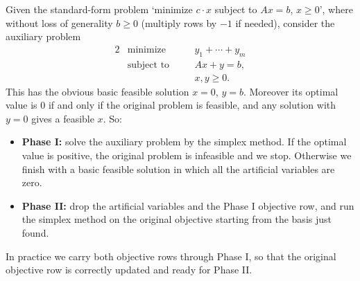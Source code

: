 Given the standard-form problem `minimize $c\cdot x$ subject to $Ax = b$, $x \geq 0$', where without loss of generality $b \geq 0$ (multiply rows by $-1$ if needed), consider the auxiliary problem
\begin{alignat*}{2}
    & \text{minimize} \quad && y_1 + \cdots + y_m \\
    & \text{subject to} \quad && Ax + y = b, \\
    & && x, y \geq 0.
\end{alignat*}
This has the obvious basic feasible solution $x = 0$, $y = b$. Moreover its optimal value is $0$ if and only if the original problem is feasible, and any solution with $y = 0$ gives a feasible $x$. So:
\begin{itemize}
    \item \textbf{Phase I:} solve the auxiliary problem by the simplex method. If the optimal value is positive, the original problem is infeasible and we stop. Otherwise we finish with a basic feasible solution in which all the artificial variables are zero.
    \item \textbf{Phase II:} drop the artificial variables and the Phase I objective row, and run the simplex method on the original objective starting from the basis just found.
\end{itemize}

In practice we carry both objective rows through Phase I, so that the original objective row is correctly updated and ready for Phase II.

